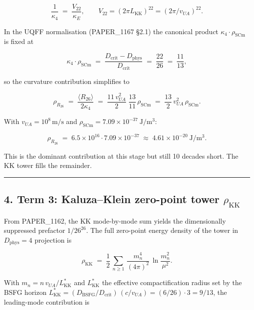 \documentclass[
]{article}
\begin{document}
\[
\frac{1}{\kappa_4} \;=\; \frac{V_{22}}{\kappa_E},\qquad
V_{22} = (2\pi L_{\mathrm{KK}})^{22} = (2\pi/v_{UA})^{22}.
\]

In the UQFF normalisation (PAPER\_1167 §2.1) the canonical product
\(\kappa_4 \cdot \rho_{\mathrm{SCm}}\) is fixed at

\[
\kappa_4 \cdot \rho_{\mathrm{SCm}} \;=\; \frac{D_{\mathrm{crit}} - D_{\mathrm{phys}}}{D_{\mathrm{crit}}}
                                       \;=\; \frac{22}{26}\;=\;\frac{11}{13},
\]

so the curvature contribution simplifies to

\[
\rho_{R_{26}} \;=\; \frac{\langle R_{26}\rangle}{2\kappa_4}
              \;=\; \frac{11\,v_{UA}^{2}}{2}\;\frac{13}{11}\,\rho_{\mathrm{SCm}}
              \;=\; \frac{13}{2}\,v_{UA}^{2}\,\rho_{\mathrm{SCm}}.
\]

With \(v_{UA}=10^{8}\,\mathrm{m/s}\) and
\(\rho_{\mathrm{SCm}}=7.09\times 10^{-37}\ \mathrm{J/m^3}\):

\[
\rho_{R_{26}} \;=\; 6.5 \times 10^{16} \cdot 7.09\times 10^{-37}
              \;\approx\; 4.61\times 10^{-20}\ \mathrm{J/m^3}.
\]

This is the dominant contribution at this stage but still 10 decades
short. The KK tower fills the remainder.

\begin{center}\rule{0.5\linewidth}{0.5pt}\end{center}

\subsection{\texorpdfstring{4. Term 3: Kaluza--Klein zero-point tower
\(\rho_{\mathrm{KK}}\)}{4. Term 3: Kaluza--Klein zero-point tower \textbackslash rho\_\{\textbackslash mathrm\{KK\}\}}}\label{term-3-kaluzaklein-zero-point-tower-rho_mathrmkk}

From PAPER\_1162, the KK mode-by-mode sum yields the dimensionally
suppressed prefactor \(1/26^{26}\). The full zero-point energy density
of the tower in \(D_{\mathrm{phys}}=4\) projection is

\[
\rho_{\mathrm{KK}} \;=\; \frac{1}{2}\,\sum_{n\ge 1}\,\frac{m_n^{4}}{(4\pi)^{2}}\,\ln\!\frac{m_n^{2}}{\mu^{2}}.
\]

With \(m_n = n\,v_{UA}/L_{\mathrm{KK}}^{*}\) and \(L_{\mathrm{KK}}^{*}\)
the effective compactification radius set by the BSFG horizon
\(L_{\mathrm{KK}}^{*} = (D_{\mathrm{BSFG}}/D_{\mathrm{crit}})\,(c/v_{UA}) = (6/26)\cdot 3 = 9/13\),
the leading-mode contribution is
\end{document}
